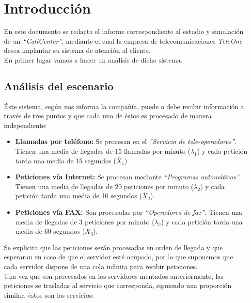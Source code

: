 \section{Introducción}

En este documento se redacta el informe correspondiente al estudio y simulación de un \emph{``CallCenter''}, mediante el cual la empresa de telecomunicaciones \emph{TeleOne} desea implantar su sistema de atención al cliente.\\

En primer lugar vamos a hacer un análisis de dicho sistema.

\subsection{Análisis del escenario}
Éste sistema, según nos informa la compañía, puede o debe recibir información a través de tres puntos y que cada uno de éstos es procesado de manera independiente:

\begin{itemize}
  \item \textbf{Llamadas por teléfono:} Se procesan en el \emph{``Servicio de tele-operadores''}. Tienen una media de llegadas de 15 llamadas por minuto ($\lambda_{1}$) y cada petición tarda una media de 15 segundos ($\overline{X}_{1}$).
  \item \textbf{Peticiones vía Internet:} Se procesan mediante \emph{``Programas automáticos''}. Tienen una media de llegadas de 20 peticiones por minuto ($\lambda_{2}$) y cada petición tarda una media de 10 segundos ($\overline{X}_{2}$).
  \item \textbf{Peticiones vía FAX:} Son procesadas por \emph{``Operadores de fax''}. Tienen una media de llegadas de 3 peticiones por minuto ($\lambda_{3}$) y cada petición tarda una media de 60 segundos ($\overline{X}_{3}$).
\end{itemize}

Se explicita que las peticiones serán procesadas en orden de llegada y que esperaran en caso de que el servidor esté ocupado, por lo que suponemos que cada servidor dispone de una cola infinita para recibir peticiones.\\

Una vez que son procesados en los servidores mentados anteriormente, las peticiones se trasladas al servicio que corresponda, siguiendo una proporción similar, éstos son los servicios:

